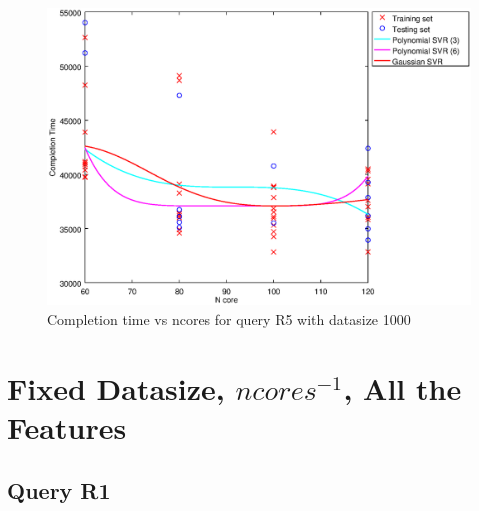 \documentclass[a4paper,11pt]{article}
\begin{document}
\begin {figure}[hbtp]
\centering
\includegraphics[width=\textwidth]{output/R5_1000_ONLY_1_LINEAR_NCORE/plot_R5_1000_bestmodels.eps}
\caption{Completion time vs ncores for query R5 with datasize 1000}
\label{fig:coreonly_linear_R5_1000}
\end {figure}


\newpage
\section{Fixed Datasize, $ncores^{-1}$, All the Features}
\subsection{Query R1}
\end{document}
